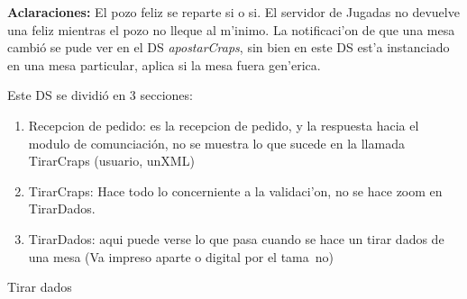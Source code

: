
% 

\textbf{Aclaraciones: }El pozo feliz se reparte si o si. El servidor de Jugadas no devuelve una feliz mientras el pozo no lleque al m'inimo.
La notificaci'on de que una mesa cambió se pude ver en el DS \textit{apostarCraps}, sin bien en este DS est'a instanciado en una mesa particular, aplica si la mesa fuera gen'erica.


Este DS se dividió en 3 secciones:
\begin{enumerate}
\item Recepcion de pedido: es la recepcion de pedido,  y la respuesta hacia el modulo de comunciación, no se muestra lo que sucede en la llamada TirarCraps (usuario, unXML)
\item  TirarCraps: Hace todo lo concerniente a la validaci'on, no se hace zoom en TirarDados.
\item TirarDados: aqui puede verse lo que pasa cuando se hace un tirar dados de una mesa (Va impreso aparte o digital por el tama~no)
\end{enumerate}

Tirar dados \tam


